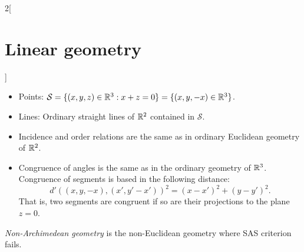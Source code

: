 \documentclass[../../../main.tex]{subfiles}
\begin{document}
\begin{multicols}{2}[\section{Linear geometry}]
\begin{definition}
    \end{definition}
    \begin{prop}
        \hfill
        \begin{itemize}
            \item Points: $\mathcal{S}=\{(x,y,z)\in\mathbb{R}^3:x+z=0\}=\{(x,y,-x)\in\mathbb{R}^3\}$.
            \item Lines: Ordinary straight lines of $\mathbb{R}^2$ contained in $\mathcal{S}$.
            \item Incidence and order relations are the same as in ordinary Euclidean geometry of $\mathbb{R}^2$.
            \item Congruence of angles is the same as in the ordinary geometry of $\mathbb{R}^3$. Congruence of segments is based in the following distance:  $$d'((x,y,-x),(x',y'-x'))^2=(x-x')^2+(y-y')^2.$$ That is, two segments are congruent if so are their projections to the plane $z=0$.
        \end{itemize}
    \end{prop}
    \begin{definition}
        \textit{Non-Archimedean geometry} is the non-Euclidean geometry where SAS criterion fails.
    \end{definition}

\end{multicols}
\end{document}
